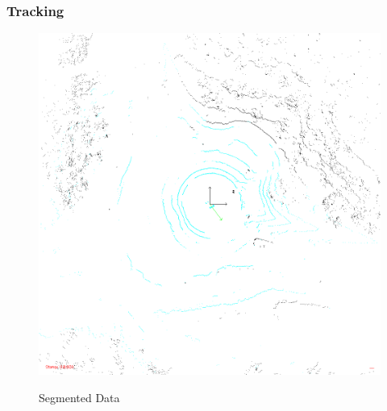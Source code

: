 \documentclass[nosymbols]{beamer}	%
\begin{document}
\begin{frame}
\frametitle{Tracking}
\begin{figure}[!ht]
\caption{Segmented Data}
\includegraphics[width=\textwidth,height=0.7\textheight,keepaspectratio]{bilder/Segmentation/img100084.png}
\label{segments}
\end{figure}
\end{frame}
\end{document}
